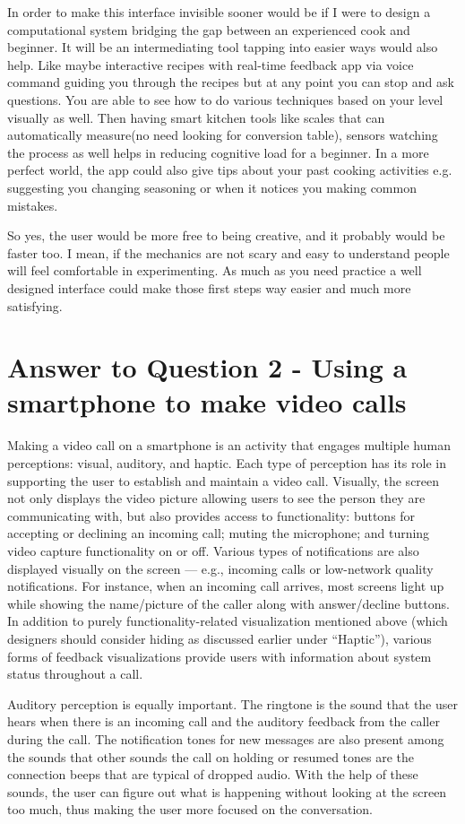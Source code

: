 \documentclass[
	letterpaper, %
]{jdf}
\begin{document}
In order to make this interface invisible sooner would be if I were to design a computational system bridging the gap between an experienced cook and beginner. It will be an intermediating tool tapping into easier ways would also help. Like maybe interactive recipes with real-time feedback app via voice command guiding you through the recipes but at any point you can stop and ask questions. You are able to see how to do various techniques based on your level visually as well. Then having smart kitchen tools like scales that can automatically measure(no need looking for conversion table), sensors watching the process as well helps in reducing cognitive load for a beginner. In a more perfect world, the app could also give tips about your past cooking activities e.g. suggesting you changing seasoning or when it notices you making common mistakes. 

So yes, the user would be more free to being creative, and it probably would be faster too. I mean, if the mechanics are not scary and easy to understand people will feel comfortable in experimenting. As much as you need practice a well designed interface could make those first steps way easier and much more satisfying.
\newpage

\section{Answer to Question 2 - Using a smartphone to make video calls }
Making a video call on a smartphone is an activity that engages multiple human perceptions: visual, auditory, and haptic. Each type of perception has its role in supporting the user to establish and maintain a video call. Visually, the screen not only displays the video picture allowing users to see the person they are communicating with, but also provides access to functionality: buttons for accepting or declining an incoming call; muting the microphone; and turning video capture functionality on or off. Various types of notifications are also displayed visually on the screen — e.g., incoming calls or low-network quality notifications. For instance, when an incoming call arrives, most screens light up while showing the name/picture of the caller along with answer/decline buttons. In addition to purely functionality-related visualization mentioned above (which designers should consider hiding as discussed earlier under “Haptic”), various forms of feedback visualizations provide users with information about system status throughout a call.

Auditory perception is equally important. The ringtone is the sound that the user hears when there is an incoming call and the auditory feedback from the caller during the call. The notification tones for new messages are also present among the sounds that other sounds the call on holding or resumed tones are the connection beeps that are typical of dropped audio. With the help of these sounds, the user can figure out what is happening without looking at the screen too much, thus making the user more focused on the conversation.
\end{document}
